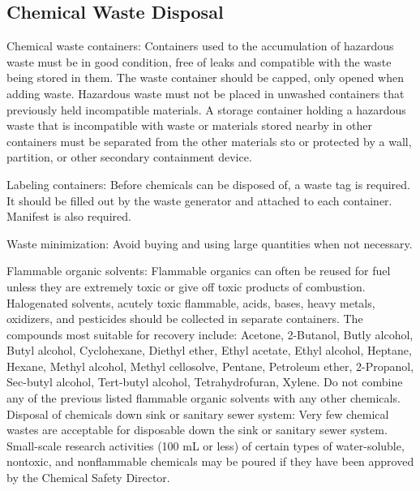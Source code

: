 \documentclass[12pt]{../SOP4_alpha}\usepackage[]{graphicx}\usepackage[]{color}
\begin{document}
\subsection*{Chemical Waste Disposal}

\NP Chemical waste containers: Containers used to the accumulation of hazardous waste must be in good condition, free of leaks and compatible with the waste being stored in them. The waste container should be capped, only opened when adding waste. Hazardous waste must not be placed in unwashed containers that previously held incompatible materials.  A storage container holding a hazardous waste that is incompatible with waste or materials stored nearby in other containers must be separated from the other materials  sto or protected by a wall, partition, or other secondary containment device. 

\NP Labeling containers: Before chemicals can be disposed of, a waste tag is required. It should be filled out by the waste generator and attached to each container. Manifest is also required. 

\NP Waste minimization: Avoid buying and using large quantities when not necessary. 

\NP Flammable organic solvents: Flammable organics can often be reused for fuel unless they are extremely toxic or give off toxic products of combustion. Halogenated solvents, acutely toxic flammable, acids, bases, heavy metals, oxidizers, and pesticides should be collected in separate containers. The compounds most suitable for recovery include: Acetone, 2-Butanol, Butly alcohol, Butyl alcohol, Cyclohexane, Diethyl ether, Ethyl acetate, Ethyl alcohol, Heptane, Hexane, Methyl alcohol, Methyl cellosolve, Pentane, Petroleum ether, 2-Propanol, Sec-butyl alcohol, Tert-butyl alcohol, Tetrahydrofuran, Xylene. Do not combine any of the previous listed flammable organic solvents with any other chemicals. 
Disposal of chemicals down sink or sanitary sewer system:
Very few chemical wastes are acceptable for disposable down the sink or sanitary sewer system. Small-scale research activities (100 mL or less) of certain types of water-soluble, nontoxic, and nonflammable chemicals may be poured if they have been approved by the Chemical Safety Director. 
\end{document}

